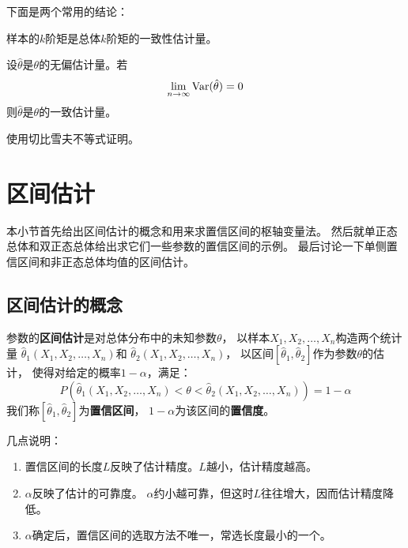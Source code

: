 下面是两个常用的结论：

\begin{theorem}
  样本的$k$阶矩是总体$k$阶矩的一致性估计量。
\end{theorem}

\begin{theorem}
  设$\hat{\theta}$是$\theta$的无偏估计量。若
  \begin{displaymath}
    \lim_{n\to\infty}\textrm{Var}(\hat{\theta})=0
  \end{displaymath}
  则$\hat{\theta}$是$\theta$的一致估计量。
\end{theorem}

\begin{remark}
  使用切比雪夫不等式证明。
\end{remark}

\section{区间估计}
本小节首先给出区间估计的概念和用来求置信区间的枢轴变量法。
然后就单正态总体和双正态总体给出求它们一些参数的置信区间的示例。
最后讨论一下单侧置信区间和非正态总体均值的区间估计。

\subsection{区间估计的概念}
参数的\textbf{区间估计}是对总体分布中的未知参数$\theta$，
以样本$X_1,X_2,\dots,X_n$构造两个统计量
$\hat{\theta}_1(X_1,X_2,\dots,X_n)$和
$\hat{\theta}_2(X_1,X_2,\dots,X_n)$，
以区间$[\hat{\theta}_1,\hat{\theta}_2]$作为参数$\theta$的估计，
使得对给定的概率$1-\alpha$，满足：
\begin{displaymath}
  P\left(\hat{\theta}_1(X_1,X_2,\dots,X_n) < \theta <
    \hat{\theta}_2(X_1,X_2,\dots,X_n)\right) = 1-\alpha
\end{displaymath}
我们称$[\hat{\theta}_1,\hat{\theta}_2]$为\textbf{置信区间}，
$1-\alpha$为该区间的\textbf{置信度}。

几点说明：
\begin{enumerate}
  \item
  置信区间的长度$L$反映了估计精度。$L$越小，估计精度越高。
  \item
  $\alpha$反映了估计的可靠度。
  $\alpha$约小越可靠，但这时$L$往往增大，因而估计精度降低。
  \item
  $\alpha$确定后，置信区间的选取方法不唯一，常选长度最小的一个。
\end{enumerate}

